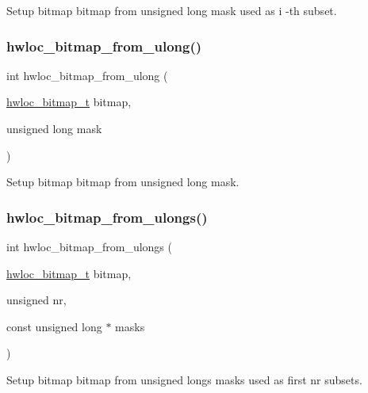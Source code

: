 Setup bitmap {\ttfamily bitmap} from unsigned long {\ttfamily mask} used as {\ttfamily i} -\/th subset. 

\mbox{\label{a00205_gad59b0ebeb29c1bfabbb2a379e55c1159}} 
\subsubsection{\texorpdfstring{hwloc\+\_\+bitmap\+\_\+from\+\_\+ulong()}{hwloc\_bitmap\_from\_ulong()}}
{\footnotesize\ttfamily int hwloc\+\_\+bitmap\+\_\+from\+\_\+ulong (\begin{DoxyParamCaption}\item[{\hyperlink{a00205_gaa3c2bf4c776d603dcebbb61b0c923d84}{hwloc\+\_\+bitmap\+\_\+t}}]{bitmap,  }\item[{unsigned long}]{mask }\end{DoxyParamCaption})}



Setup bitmap {\ttfamily bitmap} from unsigned long {\ttfamily mask}. 

\mbox{\label{a00205_gabcfef22f6fc4d4b33f068dd91a1c38f5}} 
\subsubsection{\texorpdfstring{hwloc\+\_\+bitmap\+\_\+from\+\_\+ulongs()}{hwloc\_bitmap\_from\_ulongs()}}
{\footnotesize\ttfamily int hwloc\+\_\+bitmap\+\_\+from\+\_\+ulongs (\begin{DoxyParamCaption}\item[{\hyperlink{a00205_gaa3c2bf4c776d603dcebbb61b0c923d84}{hwloc\+\_\+bitmap\+\_\+t}}]{bitmap,  }\item[{unsigned}]{nr,  }\item[{const unsigned long $\ast$}]{masks }\end{DoxyParamCaption})}



Setup bitmap {\ttfamily bitmap} from unsigned longs {\ttfamily masks} used as first {\ttfamily nr} subsets. 

